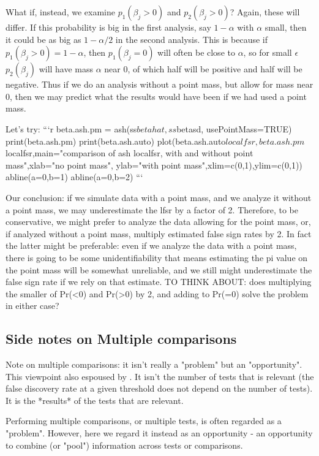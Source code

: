 \documentclass[11pt]{article}
\begin{document}
 What if, instead, we examine $p_1(\beta_j >0)$ and $p_2(\beta_j >0)$? Again, these will differ. If this probability is big in the first analysis, say $1-\alpha$ with $\alpha$ small, then it could be as big as $1-\alpha/2$ in the second analysis. This is because if $p_1(\beta_j>0)=1-\alpha$, then $p_1(\beta_j=0)$ will often be close to $\alpha$, so for small $\epsilon$ $p_2(\beta_j)$ will have mass $\alpha$ near 0, of which half will be positive and half will be negative. 
Thus if we do an analysis without a point mass, but allow
for mass near 0, then we may predict what the results would have been if we had used a point mass.

Let's try: 
```{r}
beta.ash.pm = ash(ss$betahat, ss$betasd, usePointMass=TRUE)
print(beta.ash.pm)
print(beta.ash.auto)
plot(beta.ash.auto$localfsr,beta.ash.pm$localfsr,main="comparison of ash localfsr, with and without point mass",xlab="no point mass", ylab="with point mass",xlim=c(0,1),ylim=c(0,1))
abline(a=0,b=1)
abline(a=0,b=2)
```

Our conclusion: if we simulate data with a point mass,
and we analyze it without a point mass, we may underestimate
the lfsr by a factor of 2. Therefore, to be conservative, we might prefer to analyze the data allowing for the point mass, or, if analyzed without a point mass, multiply estimated false sign rates by 2. In fact the latter might be preferable: even if we analyze the data with a point mass, there is going to be some unidentifiability
that means estimating the pi value on the point mass will be somewhat unreliable, and we still might underestimate the false sign rate if we rely on that estimate.  
TO THINK ABOUT: does multiplying the smaller of Pr(<0) and Pr(>0) by 2, and adding to Pr(=0) solve the problem in either case?


\subsection{Side notes on Multiple comparisons}

Note on multiple comparisons: it isn't really a "problem" but an "opportunity". This viewpoint also espoused by \cite{greenland1991empirical}. It isn't the number of tests that is relevant (the false
discovery rate at a given threshold does not depend on the number of tests). It is the *results* of the tests that are relevant.

Performing multiple comparisons, or multiple tests, is often
regarded as a "problem". However, here we regard it instead as an opportunity - an opportunity to combine (or "pool") information across tests or comparisons.
\end{document}
